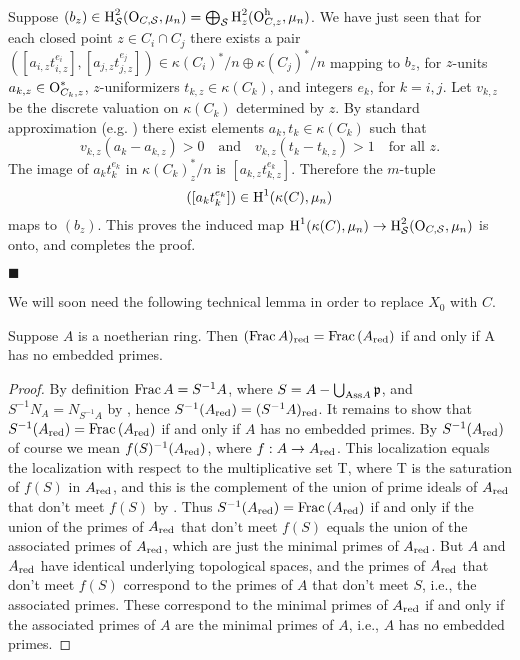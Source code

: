 \documentclass{amsart}
\theoremstyle{plain}
\theoremstyle{definition}
\theoremstyle{remark}
\numberwithin{equation}{section}%
\newcommand{\h}{{\text{\rm h}}}
\renewcommand{\H}{{\text{\rm H}}}
\renewcommand{\O}{{\text{\rm O}}}
\renewcommand{\S}{{\mathcal S}}
\newcommand{\red}{{\text{\rm red}}}
\newcommand{\Ass}{{\text{\rm Ass}}}
\newcommand{\Frac}{{\text{\rm Frac}\,}}
\begin{document}
Suppose $(b_z)\in\H^2_\S(\O_{C,\S},\mu_n)=\bigoplus_\S\H^2_z(\O_{C,z}^\h,\mu_n)$.
We have just seen that
for each closed point $z\in C_i\cap C_j$ there exists a pair 
$([a_{i,z}t_{i,z}^{e_i}],[a_{j,z}t_{j,z}^{e_j}])\in \kappa(C_i)^*/n\oplus \kappa(C_j)^*/n$
mapping to $b_z$, for $z$-units $a_{k,z}\in\O_{C_k,z}^*$, $z$-uniformizers
$t_{k,z}\in \kappa(C_k)$, and integers $e_k$, for $k=i,j$.
Let $v_{k,z}$ be the discrete valuation on $\kappa(C_k)$ determined by $z$.
By standard approximation 
(e.g. \cite[XII.1.2]{Lang}) there exist elements $a_k,t_k\in \kappa(C_k)$ such that 
$$
v_{k,z}(a_k-a_{k,z})>0\quad\text{and}\quad v_{k,z}(t_k-t_{k,z})>1\quad\text{for all $z$.}
$$
The image of $a_kt_k^{e_k}$ in $\kappa(C_k)_z^*/n$ is $[a_{k,z}t_{k,z}^{e_k}]$.
Therefore the $m$-tuple 
$$
([a_k t_k^{e_k}])\in\H^1(\kappa(C),\mu_n)
$$
maps to $(b_z)$.
This proves 
%
%
the induced map $\H^1(\kappa(C),\mu_n)\to\H^2_\S(\O_{C,\S},\mu_n)$ is onto, and completes the proof.

\hfill $\blacksquare$

We will soon need the following technical lemma in order to replace $X_0$ with $C$.


\Lemma\label{reduce}
Suppose $A$ is a noetherian ring.
Then $(\Frac A)_\red = \Frac(A_\red)$ if and only if A has no embedded primes.
\rm

\begin{proof}
By definition $\Frac A=S^{-1}A$, where $S=A-\bigcup_{\Ass A}\frak p$, 
and $S^{-1}N_A=N_{S^{-1}A}$ by \cite[3.12]{AM}, hence $S^{-1}(A_\red)=(S^{-1}A)_\red$.  
It remains to show that
$S^{-1}(A_\red) = \Frac(A_\red)$ if and only if $A$ has no embedded primes.  
By $S^{-1}(A_\red)$ of course we mean $f(S)^{-1}(A_\red)$, where $f:A\to A_\red$.  
This localization equals the localization with respect to the multiplicative set T, 
where T is the saturation of $f(S)$ in $A_\red$, and this is the complement of the union of 
prime ideals of $A_\red$ that don't meet $f(S)$ by \cite[Exercise 3.7]{AM}.  
Thus $S^{-1}(A_\red)=\Frac(A_\red)$ if and only if the union of the primes of $A_\red$ that don't meet 
$f(S)$ equals the union of the associated primes of $A_\red$, which are just the minimal primes of 
$A_\red$.  But $A$ and $A_\red$ have identical underlying topological spaces, and the primes of 
$A_\red$ that don't meet $f(S)$ correspond to the primes of $A$ that don't meet $S$, i.e., 
the associated primes. These correspond to the minimal primes of $A_\red$ if and only if 
the associated primes of $A$ are the minimal primes of $A$, i.e., 
$A$ has no embedded primes.
\end{proof}
\end{document}
